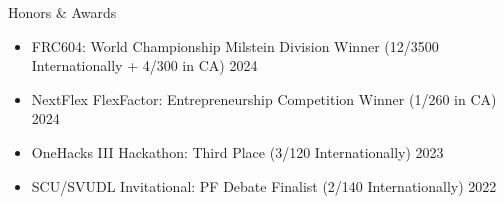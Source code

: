 \documentclass[
  10pt, %
]{resume} %
\begin{document}
\begin{rSection}{Honors \& Awards}

  \begin{itemize}
      \setlength\itemsep{-0.7em} %
        
      \item FRC604: World Championship Milstein Division Winner (12/3500 Internationally + 4/300 in CA) \hfill 2024
              
      \item NextFlex FlexFactor: Entrepreneurship Competition Winner (1/260 in CA) \hfill 2024
              
      \item OneHacks III Hackathon: Third Place (3/120 Internationally) \hfill 2023
              
      \item SCU/SVUDL Invitational: PF Debate Finalist (2/140 Internationally) \hfill 2022
              


    \end{itemize}

\end{rSection}
\end{document}
